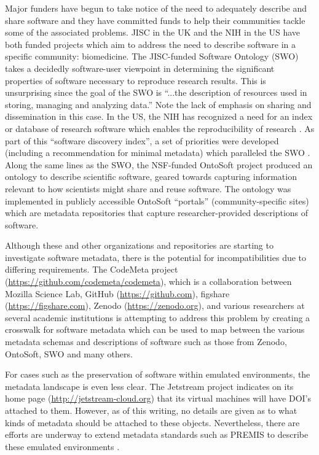 \documentclass[letterpaper,11pt]{article}
\begin{document}
Major funders have begun to take notice of the need to adequately describe and share software and they have committed funds to help their communities tackle some of the associated problems. JISC in the UK and the NIH in the US have both funded projects which aim to address the need to describe software in a specific community: biomedicine. The JISC-funded Software Ontology (SWO) \citep{malone2014a} takes a decidedly software-user viewpoint in determining the significant properties of software necessary to reproduce research results. This is unsurprising since the goal of the SWO is ``...the description of resources used in storing, managing and analyzing data.'' Note the lack of emphasis on sharing and dissemination in this case. In the US, the NIH has recognized a need for an index or database of research software which enables the reproducibility of research \citep{bonazzi2015}. As part of this ``software discovery index'', a set of priorities were developed (including a recommendation for minimal metadata) which paralleled the SWO \citep{malone2014}.  Along the same lines as the SWO, the NSF-funded OntoSoft project \citep{gil2015} produced an ontology to describe scientific software, geared towards capturing information relevant to how scientists might share and reuse software. The ontology was implemented in publicly accessible OntoSoft ``portals'' (community-specific sites) which are metadata repositories that capture researcher-provided descriptions of software.

Although these and other organizations and repositories are starting to investigate software metadata, there is the potential for incompatibilities due to differing requirements. The CodeMeta project (\url{https://github.com/codemeta/codemeta}), which is a collaboration between Mozilla Science Lab, GitHub (\url{https://github.com}),  figshare (\url{https://figshare.com}), Zenodo (\url{https://zenodo.org}), and various researchers at several academic institutions is attempting to address this problem by creating a crosswalk for software metadata which can be used to map between the various metadata schemas and descriptions of  software such as those from Zenodo, OntoSoft, SWO and many others.

For cases such as the preservation of software within emulated environments, the metadata landscape is even less clear. The Jetstream project indicates on its home page (\url{http://jetstream-cloud.org}) that its virtual machines will have DOI’s attached to them. However, as of this writing, no details are given as to what kinds of metadata should be attached to these objects. Nevertheless, there are efforts are underway to extend metadata standards such as PREMIS to describe these emulated environments \citep{rosenthal2015}. 
\end{document}
